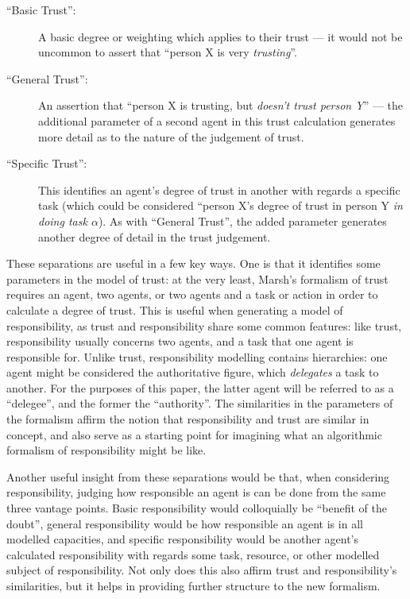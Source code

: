 \begin{description}
    \item [``Basic Trust'': ] A basic degree or weighting which applies to their trust --- it would not be uncommon to assert that ``person X is very \emph{trusting}''.
    \item [``General Trust'': ] An assertion that ``person X is trusting, but \emph{doesn't trust person Y}'' --- the additional parameter of a second agent in this trust calculation generates more detail as to the nature of the judgement of trust.
    \item [``Specific Trust'': ] This identifies an agent's degree of trust in another with regards a specific task (which could be considered ``person X's degree of trust in person Y \emph{in doing task \(\alpha\)}). As with ``General Trust'', the added parameter generates another degree of detail in the trust judgement.
\end{description}

These separations are useful in a few key ways. One is that it identifies some parameters in the model of trust: at the very least, Marsh's formalism of trust requires an agent, two agents, or two agents and a task or action in order to calculate a degree of trust. This is useful when generating a model of responsibility, as trust and responsibility share some common features: like trust, responsibility usually concerns two agents, and a task that one agent is responsible for. Unlike trust, responsibility modelling contains hierarchies: one agent might be considered the authoritative figure, which \emph{delegates} a task to another. For the purposes of this paper, the latter agent will be referred to as a ``delegee'', and the former the ``authority''. The similarities in the parameters of the formalism affirm the notion that responsibility and trust are similar in concept, and also serve as a starting point for imagining what an algorithmic formalism of responsibility might be like.\par

Another useful insight from these separations would be that, when considering responsibility, judging how responsible an agent is can be done from the same three vantage points. Basic responsibility would colloquially be ``benefit of the doubt'', general responsibility would be how responsible an agent is in all modelled capacities, and specific responsibility would be another agent's calculated responsibility with regards some task, resource, or other modelled subject of responsibility. Not only does this also affirm trust and responsibility's similarities, but it helps in providing further structure to the new formalism.\par

